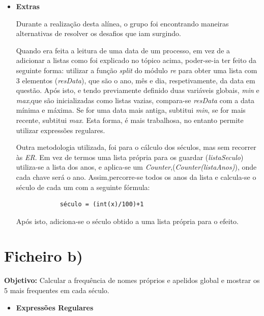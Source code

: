 \documentclass[11pt,a4paper]{report}
\begin{document}
	\vspace{0.5cm}
      	\begin{itemize}
		\item \textbf{Extras}\par

 \qquad Durante a realização desta alínea, o grupo foi encontrando maneiras alternativas de resolver os desafios que iam surgindo.\par
	    \qquad Quando era feita a leitura de uma data de um processo, em vez de a adicionar a listas como foi explicado no tópico acima, poder-se-ia ter feito da seguinte forma: utilizar a função \textit{split} do módulo \textit{re} para obter uma lista com 3 elementos (\textit{resData}), que são o ano, mês e dia, respetivamente, da data em questão. Após isto, e tendo previamente definido duas variáveis globais, \textit{min} e \textit{max},que são inicializadas como listas vazias, compara-se \textit{resData} com a data mínima e máxima. Se for uma data mais antiga, subtitui \textit{min}, se for mais recente, subtitui \textit{max}. Esta forma, é mais trabalhosa, no entanto permite utilizar expressões regulares.\par
	   \qquad  Outra metodologia utilizada, foi para o cálculo dos séculos, mas sem recorrer às \textit{ER}. Em vez de termos uma lista própria para os guardar (\textit{listaSeculo}) utiliza-se a lista dos anos, e aplica-se um \textit{Counter},(\textit{Counter(listaAnos)}), onde cada chave será o ano. Assim,percorre-se todos os anos da lista e calcula-se o século de cada um com a seguinte fórmula:\par
	      \begin{center}
	      	\begin{verbatim}
	      	século = (int(x)/100)+1
	      \end{verbatim}
	      \end{center}
     \qquad  Após isto, adiciona-se o século obtido a uma lista própria para o efeito.
	\end{itemize}

	\newpage
	\section*{Ficheiro b)}

	\textbf{Objetivo:} Calcular a frequência de nomes próprios e apelidos global e mostrar os 5 mais frequentes em cada século.
	\begin{itemize}
	\item \textbf{Expressões Regulares}
	\end{itemize}
	
\end{document}
